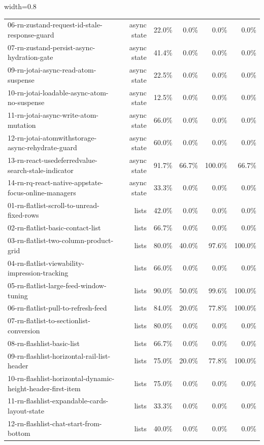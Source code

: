 \begin{table}[htbp]
\begin{adjustbox}{width=0.8\textwidth}
\begin{tabular}{lrrrrr}
06-rn-zustand-request-id-stale-response-guard & async state & 22.0\% & 0.0\% & 0.0\% & 0.0\% \\
07-rn-zustand-persist-async-hydration-gate & async state & 41.4\% & 0.0\% & 0.0\% & 0.0\% \\
09-rn-jotai-async-read-atom-suspense & async state & 22.5\% & 0.0\% & 0.0\% & 0.0\% \\
10-rn-jotai-loadable-async-atom-no-suspense & async state & 12.5\% & 0.0\% & 0.0\% & 0.0\% \\
11-rn-jotai-async-write-atom-mutation & async state & 66.0\% & 0.0\% & 0.0\% & 0.0\% \\
12-rn-jotai-atomwithstorage-async-rehydrate-guard & async state & 60.0\% & 0.0\% & 0.0\% & 0.0\% \\
13-rn-react-usedeferredvalue-search-stale-indicator & async state & 91.7\% & 66.7\% & 100.0\% & 66.7\% \\
14-rn-rq-react-native-appstate-focus-online-managers & async state & 33.3\% & 0.0\% & 0.0\% & 0.0\% \\
01-rn-flatlist-scroll-to-unread-fixed-rows & lists & 42.0\% & 0.0\% & 0.0\% & 0.0\% \\
02-rn-flatlist-basic-contact-list & lists & 66.7\% & 0.0\% & 0.0\% & 0.0\% \\
03-rn-flatlist-two-column-product-grid & lists & 80.0\% & 40.0\% & 97.6\% & 100.0\% \\
04-rn-flatlist-viewability-impression-tracking & lists & 66.0\% & 0.0\% & 0.0\% & 0.0\% \\
05-rn-flatlist-large-feed-window-tuning & lists & 90.0\% & 50.0\% & 99.6\% & 100.0\% \\
06-rn-flatlist-pull-to-refresh-feed & lists & 84.0\% & 20.0\% & 77.8\% & 100.0\% \\
07-rn-flatlist-to-sectionlist-conversion & lists & 80.0\% & 0.0\% & 0.0\% & 0.0\% \\
08-rn-flashlist-basic-list & lists & 66.7\% & 0.0\% & 0.0\% & 0.0\% \\
09-rn-flashlist-horizontal-rail-list-header & lists & 75.0\% & 20.0\% & 77.8\% & 100.0\% \\
10-rn-flashlist-horizontal-dynamic-height-header-first-item & lists & 75.0\% & 0.0\% & 0.0\% & 0.0\% \\
11-rn-flashlist-expandable-cards-layout-state & lists & 33.3\% & 0.0\% & 0.0\% & 0.0\% \\
12-rn-flashlist-chat-start-from-bottom & lists & 40.0\% & 0.0\% & 0.0\% & 0.0\% \\

\end{tabular}
\end{adjustbox}
\end{table}
